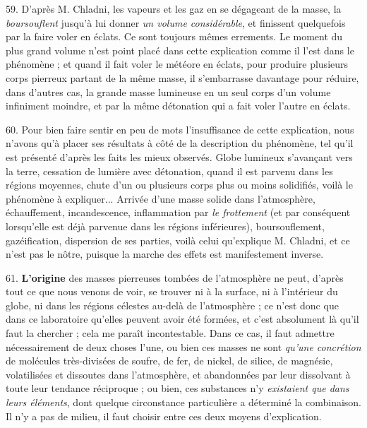 \documentclass[a4paper, 11pt, oneside, polutonikogreek, french]{article}
\begin{document}
59. D'après M. Chladni, les vapeurs et les gaz en se dégageant de la masse, la \emph{boursouflent} jusqu'à lui donner \emph{un volume considérable}, et finissent quelquefois par la faire voler en éclats. Ce sont toujours mêmes errements. Le moment du plus grand volume n'est point placé dans cette explication comme il l'est dans le phénomène ; et quand il fait voler le météore en éclats, pour produire plusieurs corps pierreux partant de la même masse, il s'embarrasse davantage pour réduire, dans d'autres cas, la grande masse lumineuse en un seul corps d'un volume infiniment moindre, et par la même détonation qui a fait voler l'autre en éclats.

60. Pour bien faire sentir en peu de mots l'insuffisance de cette explication, nous n'avons qu'à placer ses résultats à côté de la description du phénomène, tel qu'il est présenté d'après les faits les mieux observés. \og Globe lumineux s'avançant vers la terre, cessation de lumière avec détonation, quand il est parvenu dans les régions moyennes, chute d'un ou plusieurs corps plus ou moins solidifiés, voilà le phénomène à expliquer... Arrivée d'une masse solide dans l'atmosphère, échauffement, incandescence, inflammation par \emph{le frottement} (et par conséquent lorsqu'elle est déjà parvenue dans les régions inférieures), boursouflement, gazéification, dispersion de ses parties, voilà celui qu'explique M. Chladni, et ce n'est pas le nôtre, puisque la marche des effets est manifestement inverse.

61. \textbf{L'origine} des masses pierreuses tombées de l'atmosphère ne peut, d'après tout ce que nous venons de voir, se trouver ni à la surface, ni à l'intérieur du globe, ni dans les régions célestes au-delà de l'atmosphère ; ce n'est donc que dans ce laboratoire qu'elles peuvent avoir été formées, et c'est absolument là qu'il faut la chercher ; cela me paraît incontestable. Dans ce cas, il faut admettre nécessairement de deux choses l'une, ou bien ces masses ne sont \emph{qu'une concrétion} de molécules très-divisées de soufre, de fer, de nickel, de silice, de magnésie, volatilisées et dissoutes dans l'atmosphère, et abandonnées par leur dissolvant à toute leur tendance réciproque ; ou bien, ces substances n'y \emph{existaient que dans leurs éléments}, dont quelque circonstance particulière a déterminé la combinaison. Il n'y a pas de milieu, il faut choisir entre ces deux moyens d'explication.
\end{document}
